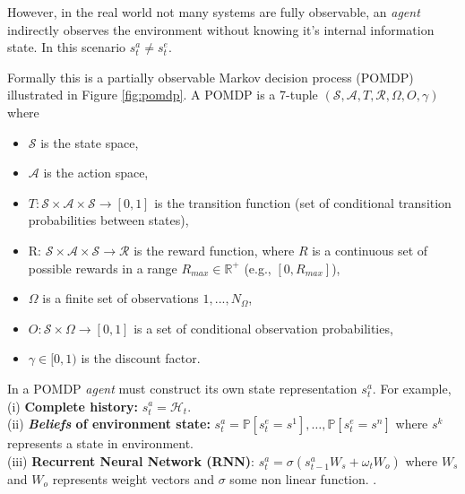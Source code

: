 \vspace{3mm}

However, in the real world not many systems are fully observable, an {\em agent} indirectly observes the environment without knowing it's internal information state. In this scenario $s_t^a \neq s^e_t$.



Formally this is a partially observable Markov decision process (POMDP) illustrated in Figure \ref{fig:pomdp}.
\vspace{5mm}
A POMDP is a 7-tuple $(\mathcal{S}, \mathcal{A}, T, \mathcal{R}, \Omega, O, \gamma)$ where
\begin{itemize}
  \item[] $\mathcal{S}$ is the state space,
  \item[] $\mathcal{A}$ is the action space,
  \item[] $T : \mathcal{S} \times \mathcal{A}\times \mathcal{S} \rightarrow [0, 1]$ is the transition function (set of conditional
  transition probabilities between states),
  \item[] R: $\mathcal{S} \times \mathcal{A}\times \mathcal{S} \rightarrow \mathcal{R}$ is the reward function, where $R$ is a continuous set of possible rewards in a range $R_{max} \in \mathbb{R}^+$ (e.g., $[0, R_{max}]$),
  \item[] $\Omega$ is a finite set of observations ${1, . . . , N_{\Omega}}$,
  \item[] $O : \mathcal{S} \times \Omega \rightarrow [0, 1]$ is a set of conditional observation probabilities,
  \item[] $\gamma \in  [0, 1)$ is the discount factor.
\end{itemize}


In a POMDP {\em agent} must construct its own state representation $s_t^a$. For example,\\
(i) \textbf{Complete history:} $s_t^a = \mathcal{H}_t$.\\
(ii) \textbf{{\em Beliefs} of environment state:} $s_t^a = \mathbb{P}[s_t^e = s^1],\ldots,\mathbb{P}[s_t^e = s^n]$ where $s^k$ represents a state in environment.\\
(iii) \textbf{Recurrent Neural Network (RNN)}: $s_t^a = \sigma(s_{t-1}^a W_s + \omega_t W_o)$ where $W_s$ and $W_o$ represents weight vectors and $\sigma$ some non linear function. \cite{wierstra2010recurrent, hausknecht2015deep, heess2015memory}.

